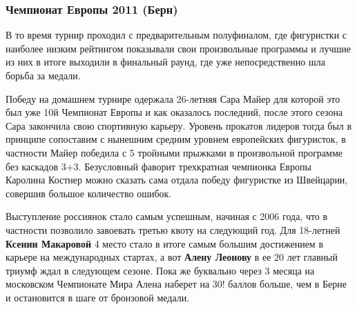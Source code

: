  
 
 
 
 

\subsubsection{Чемпионат Европы 2011 (Берн)}

В то время турнир проходил с предварительным полуфиналом, где фигуристки с
наиболее низким рейтингом показывали свои произвольные программы и лучшие из
них в итоге выходили в финальный раунд, где уже непосредственно шла борьба за
медали.


Победу на домашнем турнире одержала 26-летняя Сара Майер для которой это был
уже 10й Чемпионат Европы и как оказалось последний, после этого сезона Сара
закончила свою спортивную карьеру. Уровень прокатов лидеров тогда был в
принципе сопоставим с нынешним средним уровнем европейских фигуристок, в
частности Майер победила с 5 тройными прыжками в произвольной программе без
каскадов 3+3. Безусловный фаворит трехкратная чемпионка Европы Каролина Костнер
можно сказать сама отдала победу фигуристке из Швейцарии, совершив большое
количество ошибок.

Выступление россиянок стало самым успешным, начиная с 2006 года, что в
частности позволило завоевать третью квоту на следующий год. Для 18-летней
\textbf{Ксении Макаровой} 4 место стало в итоге самым большим достижением в карьере на
международных стартах, а вот \textbf{Алену Леонову} в ее 20 лет главный триумф ждал в
следующем сезоне. Пока же буквально через 3 месяца на московском Чемпионате
Мира Алена наберет на 30! баллов больше, чем в Берне и остановится в шаге от
бронзовой медали.

